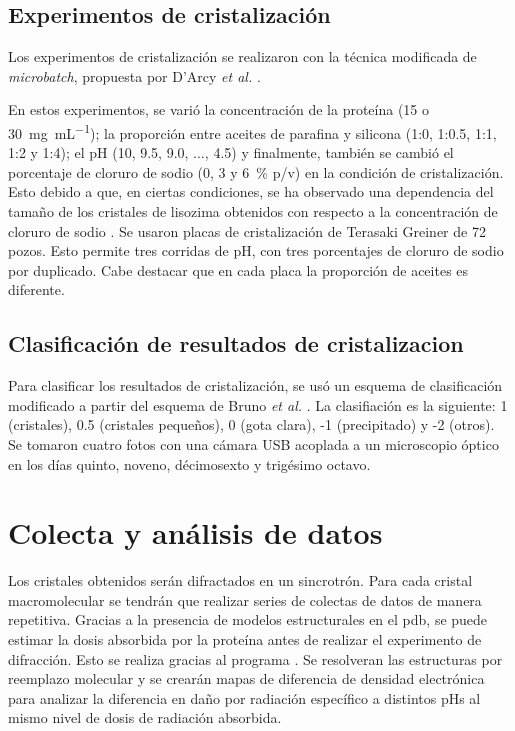 \subsection{Experimentos de cristalización}
Los experimentos de cristalización se realizaron con la técnica modificada de \emph{microbatch}, propuesta por D'Arcy \emph{et al.} \cite{DArcy1996}. 

En estos experimentos, se varió la concentración de la proteína (15 o \SI{30}{\milli\gram\per\milli\liter}); la proporción entre aceites de parafina y silicona (1:0, 1:0.5, 1:1, 1:2 y 1:4); el pH (10, 9.5, 9.0, $\ldots$, 4.5) y finalmente, también se cambió el porcentaje de cloruro de sodio (0, 3 y \SI{6}{\percent} p/v) en la condición de cristalización. Esto debido a que, en ciertas condiciones, se ha observado una dependencia del tamaño de los cristales de lisozima obtenidos con respecto a la concentración de cloruro de sodio \cite{Svanidze2005}. Se usaron placas de cristalización de Terasaki Greiner de \num{72} pozos. Esto permite tres corridas de pH, con tres porcentajes de cloruro de sodio por duplicado. Cabe destacar que en cada placa la proporción de aceites es diferente. 

\subsection{Clasificación de resultados de cristalizacion}
Para clasificar los resultados de cristalización, se usó un esquema de clasificación modificado a partir del esquema de Bruno \emph{et al.} \cite{Bruno2018}. La clasifiación es la siguiente: 1 (cristales), 0.5 (cristales pequeños), 0 (gota clara), -1 (precipitado) y -2 (otros). Se tomaron cuatro fotos con una cámara USB acoplada a un microscopio óptico en los días quinto, noveno, décimosexto y trigésimo octavo.

\section{Colecta y análisis de datos}
Los cristales obtenidos serán difractados en un sincrotrón. Para cada cristal macromolecular se tendrán que realizar series de colectas de datos de manera repetitiva. Gracias a la presencia de modelos estructurales en el \acrshort{pdb}, se puede estimar la dosis absorbida por la proteína antes de realizar el experimento de difracción. Esto se realiza gracias al programa  . Se resolveran las estructuras por reemplazo molecular y se crearán mapas de diferencia de densidad electrónica para analizar la diferencia en daño por radiación específico a distintos pHs al mismo nivel de dosis de radiación absorbida. %
